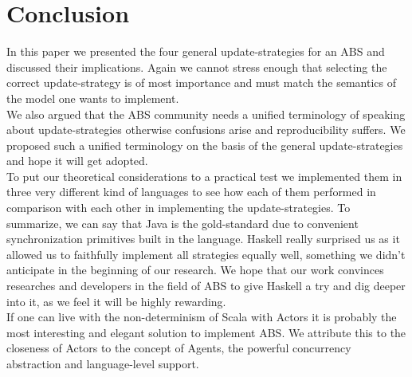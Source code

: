 \section{Conclusion}
In this paper we presented the four general update-strategies for an ABS and discussed their implications. Again we cannot stress enough that selecting the correct update-strategy is of most importance and must match the semantics of the model one wants to implement. \\
We also argued that the ABS community needs a unified terminology of speaking about update-strategies otherwise confusions arise and reproducibility suffers. We proposed such a unified terminology on the basis of the general update-strategies and hope it will get adopted. \\
To put our theoretical considerations to a practical test we implemented them in three very different kind of languages to see how each of them performed in comparison with each other in implementing the update-strategies. To summarize, we can say that Java is the gold-standard due to convenient synchronization primitives built in the language. Haskell really surprised us as it allowed us to faithfully implement all strategies equally well, something we didn't anticipate in the beginning of our research. We hope that our work convinces researches and developers in the field of ABS to give Haskell a try and dig deeper into it, as we feel it will be highly rewarding. \\
If one can live with the non-determinism of Scala with Actors it is probably the most interesting and elegant solution to implement ABS. We attribute this to the closeness of Actors to the concept of Agents, the powerful concurrency abstraction and language-level support.